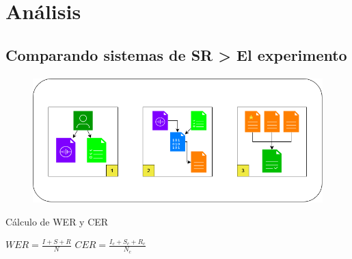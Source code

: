 \section{Análisis}

\subsection{Comparando sistemas de SR > El experimento}
\begin{frame}{\insertsectionhead}
  \framesubtitle{\insertsubsectionhead}
  
  	\begin{figure}
  		\includegraphics[height=0.45\textheight]{images/ProcesoExperimento.png}
  	\end{figure}
	
	\begin{alertblock}{Cálculo de WER y CER}
		\begin{center}
			$WER = \frac{I+S+R}{N}$
			\hspace{3cm}
			$CER = \frac{I_c+S_c+R_c}{N_c}$
		\end{center}
	\end{alertblock}
\end{frame}


